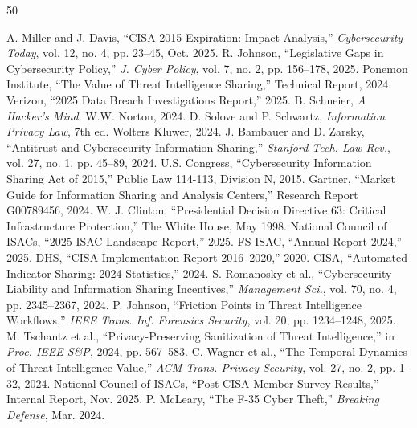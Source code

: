 \documentclass[journal]{IEEEtran}
\begin{document}
\sloppy
\begin{thebibliography}{50}

 A. Miller and J. Davis, ``CISA 2015 Expiration: Impact Analysis,'' \emph{Cybersecurity Today}, vol. 12, no. 4, pp. 23--45, Oct. 2025.
 R. Johnson, ``Legislative Gaps in Cybersecurity Policy,'' \emph{J. Cyber Policy}, vol. 7, no. 2, pp. 156--178, 2025.
 Ponemon Institute, ``The Value of Threat Intelligence Sharing,'' Technical Report, 2024.
 Verizon, ``2025 Data Breach Investigations Report,'' 2025.
 B. Schneier, \emph{A Hacker's Mind}. W.W. Norton, 2024.
 D. Solove and P. Schwartz, \emph{Information Privacy Law}, 7th ed. Wolters Kluwer, 2024.
 J. Bambauer and D. Zarsky, ``Antitrust and Cybersecurity Information Sharing,'' \emph{Stanford Tech. Law Rev.}, vol. 27, no. 1, pp. 45--89, 2024.
 U.S. Congress, ``Cybersecurity Information Sharing Act of 2015,'' Public Law 114-113, Division N, 2015.
 Gartner, ``Market Guide for Information Sharing and Analysis Centers,'' Research Report G00789456, 2024.
 W. J. Clinton, ``Presidential Decision Directive 63: Critical Infrastructure Protection,'' The White House, May 1998.
 National Council of ISACs, ``2025 ISAC Landscape Report,'' 2025.
 FS-ISAC, ``Annual Report 2024,'' 2025.
 DHS, ``CISA Implementation Report 2016--2020,'' 2020.
 CISA, ``Automated Indicator Sharing: 2024 Statistics,'' 2024.
 S. Romanosky et al., ``Cybersecurity Liability and Information Sharing Incentives,'' \emph{Management Sci.}, vol. 70, no. 4, pp. 2345--2367, 2024.
 P. Johnson, ``Friction Points in Threat Intelligence Workflows,'' \emph{IEEE Trans. Inf. Forensics Security}, vol. 20, pp. 1234--1248, 2025.
 M. Tschantz et al., ``Privacy-Preserving Sanitization of Threat Intelligence,'' in \emph{Proc. IEEE S\&P}, 2024, pp. 567--583.
 C. Wagner et al., ``The Temporal Dynamics of Threat Intelligence Value,'' \emph{ACM Trans. Privacy Security}, vol. 27, no. 2, pp. 1--32, 2024.
 National Council of ISACs, ``Post-CISA Member Survey Results,'' Internal Report, Nov. 2025.
 P. McLeary, ``The F-35 Cyber Theft,'' \emph{Breaking Defense}, Mar. 2024.

\end{thebibliography}
\end{document}
